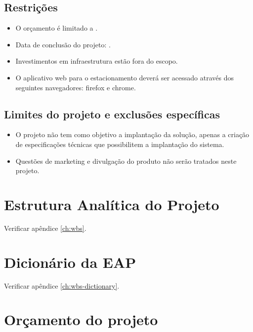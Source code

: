 \subsection{Restrições}

\begin{itemize}
	\item O orçamento é limitado a \maximumBudget{}.
	\item Data de conclusão do projeto: \maximumDeadline{}.
	\item Investimentos em infraestrutura estão fora do escopo.
	\item O aplicativo web para o estacionamento deverá ser acessado através dos seguintes navegadores: firefox e chrome.
\end{itemize}

\subsection{Limites do projeto e exclusões específicas}

\begin{itemize}
	\item O projeto não tem como objetivo a implantação da solução, apenas a criação de especificações técnicas que possibilitem a implantação do sistema.
	\item Questões de marketing e divulgação do produto não serão tratados neste projeto.
\end{itemize}

\section{Estrutura Analítica do Projeto}

Verificar apêndice \ref{ch:wbs}.

\section{Dicionário da EAP}

Verificar apêndice \ref{ch:wbs-dictionary}.

\section{Orçamento do projeto}

